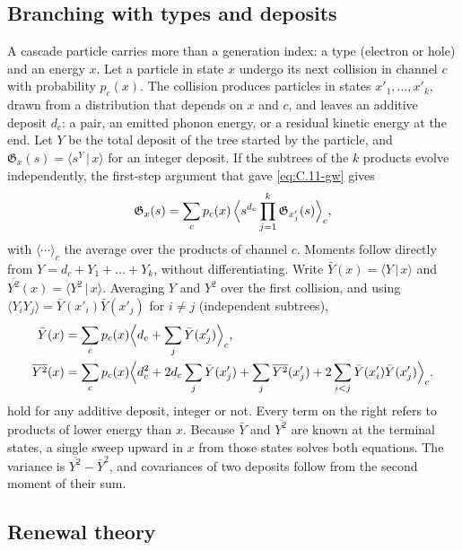 \subsection{Branching with types and deposits}

A cascade particle carries more than a generation index: a type (electron or hole) and an energy $x$. Let a particle in state $x$ undergo its next collision in channel $c$ with probability $p_c(x)$. The collision produces particles in states $x'_1, \dots, x'_k$, drawn from a distribution that depends on $x$ and $c$, and leaves an additive deposit $d_c$: a pair, an emitted phonon energy, or a residual kinetic energy at the end. Let $Y$ be the total deposit of the tree started by the particle, and $\mathfrak{G}_x(s) = \langle s^Y\,|\,x\rangle$ for an integer deposit. If the subtrees of the $k$ products evolve independently, the first-step argument that gave \cref{eq:C.11-gw} gives
\begin{equation}
  \mathfrak{G}_x(s) = \sum_c p_c(x)\,\Bigl\langle s^{d_c}\prod_{j=1}^{k}\mathfrak{G}_{x'_j}(s)\Bigr\rangle_c ,
  \label{eq:C.11-functional}
\end{equation}
with $\langle\cdots\rangle_c$ the average over the products of channel $c$. Moments follow directly from $Y = d_c + Y_1 + \dots + Y_k$, without differentiating. Write $\bar Y(x) = \langle Y\,|\,x\rangle$ and $\overline{Y^2}(x) = \langle Y^2\,|\,x\rangle$. Averaging $Y$ and $Y^2$ over the first collision, and using $\langle Y_iY_j\rangle = \bar Y(x'_i)\bar Y(x'_j)$ for $i \ne j$ (independent subtrees),
\begin{align}
  \bar Y(x) &= \sum_c p_c(x)\Bigl\langle d_c + \sum_j\bar Y(x'_j)\Bigr\rangle_c ,
  \label{eq:C.11-mean}\\
  \overline{Y^2}(x) &= \sum_c p_c(x)\Bigl\langle d_c^2 + 2d_c\sum_j\bar Y(x'_j) + \sum_j\overline{Y^2}(x'_j) + 2\sum_{i<j}\bar Y(x'_i)\bar Y(x'_j)\Bigr\rangle_c .
  \label{eq:C.11-second}
\end{align}
 hold for any additive deposit, integer or not. Every term on the right refers to products of lower energy than $x$. Because $\bar Y$ and $\overline{Y^2}$ are known at the terminal states, a single sweep upward in $x$ from those states solves both equations. The variance is $\overline{Y^2} - \bar Y^2$, and covariances of two deposits follow from the second moment of their sum.

\subsection{Renewal theory}

